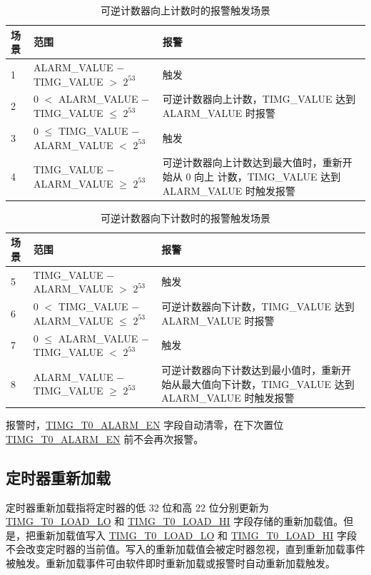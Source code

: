 \documentclass[main\_\_CN.tex]{subfiles}
\begin{document}
\begin{table}[H]
\centering
\caption{可逆计数器向上计数时的报警触发场景}
\label{tab:timg-alarm-generation-up}

\begin{tabular}{|l|l|m{7cm}|}
\hline
\rowcolor{lightgray}
    \textbf{场景} & \textbf{范围} & \textbf{报警} \\\hline
     1 & ALARM\_VALUE $-$ TIMG\_VALUE $>$ $2^{53}$ & 触发 \\\hline
     2 & 0 $<$ ALARM\_VALUE $-$ TIMG\_VALUE $\leq$ $2^{53}$ & 可逆计数器向上计数，TIMG\_VALUE 达到 ALARM\_VALUE 时报警 \\\hline
     3 & 0 $\leq$ TIMG\_VALUE $-$ ALARM\_VALUE $<$ $2^{53}$ & 触发 \\\hline
     4 & TIMG\_VALUE $-$ ALARM\_VALUE $\geq$ $2^{53}$ & 可逆计数器向上计数达到最大值时，重新开始从 0 向上 计数，TIMG\_VALUE 达到 ALARM\_VALUE 时触发报警\\\hline

\end{tabular}
\end{table}

\begin{table}[H]
\centering
\caption{可逆计数器向下计数时的报警触发场景}
\label{tab:timg-alarm-generation-down}

\begin{tabular}{|l|l|m{7cm}|}
\hline
\rowcolor{lightgray}
    \textbf{场景} & \textbf{范围} & \textbf{报警} \\\hline
     5 & TIMG\_VALUE $-$ ALARM\_VALUE  $>$ $2^{53}$ & 触发 \\\hline
     6 &  0 $<$ TIMG\_VALUE $-$ ALARM\_VALUE $\leq$ $2^{53}$ & 可逆计数器向下计数，TIMG\_VALUE 达到 ALARM\_VALUE 时报警 \\\hline
     7 & 0 $\leq$ ALARM\_VALUE $-$ TIMG\_VALUE $<$ $2^{53}$ & 触发 \\\hline
     8 & ALARM\_VALUE $-$ TIMG\_VALUE $\geq$ $2^{53}$ & 可逆计数器向下计数达到最小值时，重新开始从最大值向下计数，TIMG\_VALUE 达到 ALARM\_VALUE 时触发报警 \\\hline

\end{tabular}
\end{table}

报警时，\hyperref[fielddesc:TIMGTXALARMEN]{TIMG\_T0\_ALARM\_EN} 字段自动清零，在下次置位 \hyperref[fielddesc:TIMGTXALARMEN]{TIMG\_T0\_ALARM\_EN} 前不会再次报警。

\subsection{定时器重新加载} \label{sec:timg-func-descr-reload}
定时器重新加载指将定时器的低 32 位和高 22 位分别更新为 \hyperref[fielddesc:TIMGTXLOADLO]{TIMG\_T0\_LOAD\_LO} 和 \hyperref[fielddesc:TIMGTXLOADHI]{TIMG\_T0\_LOAD\_HI} 字段存储的重新加载值。但是，把重新加载值写入 \hyperref[fielddesc:TIMGTXLOADLO]{TIMG\_T0\_LOAD\_LO} 和 \hyperref[fielddesc:TIMGTXLOADHI]{TIMG\_T0\_LOAD\_HI} 字段不会改变定时器的当前值。写入的重新加载值会被定时器忽视，直到重新加载事件被触发。重新加载事件可由软件即时重新加载或报警时自动重新加载触发。
\end{document}
